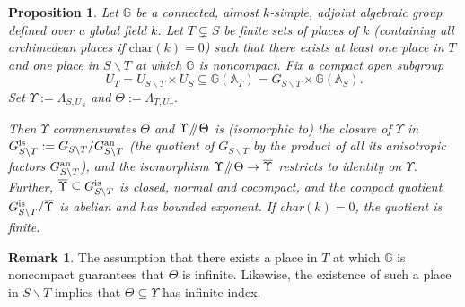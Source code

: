 \documentclass[JEP,XML,SOM,Unicode,published]{cedram}
\newcommand{\Y}{\ensuremath{\Upsilon}}
\let\bs\backslash
\newcommand{\sslash}{\mathbin{\mkern-3mu /\mkern-5mu/ \mkern-3mu}}
\newcommand{\bbA}{\ensuremath{\mathbb{A}}}
\newcommand{\bbG}{\ensuremath{\mathbb{G}}}
\newtheorem{prop}[thm]{Proposition}
\theoremstyle{definition}
\newtheorem{rem}[thm]{Remark}
\begin{document}
\begin{prop}\label{prop:schlichting-arithmetic}
Let $\bbG$ be a connected, almost $k$-simple, adjoint algebraic group defined over a global field $k$. Let $T\subsetneq S$ be finite sets of places of $k$ (containing all archimedean places if $\mathrm{char}(k)=0$) such that there exists at least one place in $T$ and one place in $S\bs T$ at which $\bbG$ is noncompact. Fix a compact open subgroup
\[
U_T=U_{S\bs T} \times U_S\subseteq \bbG(\bbA_T)=G_{S\bs T}\times \bbG(\bbA_S).
\]
Set $\Y:=\Lambda_{S,U_S}$ and $\Theta:=\Lambda_{T,U_T}$.

Then $\Y$ commensurates $\Theta$ and $\Y\sslash\Theta$ is (isomorphic to) the closure of $\Y$ in $G_{S\bs T}^{\textup{is}}:=G_{S\bs T}/G_{S\bs T}^{\textup{an}}$ (the quotient of $G_{S\bs T}$ by the product of all its anisotropic factors $G_{S\bs T}^{\textup{an}}$), and the isomorphism $\Y\sslash\Theta\to\overline{\Y}$ restricts to identity on $\Y$. Further, $\overline{\Y}\subseteq G_{S\bs T}^{\textup{is}}$ is closed, normal and cocompact, and the compact quotient $G_{S\bs T}^{\textup{is}}/\overline{\Y}$ is abelian and has bounded exponent. If char$(k)=0$, the quotient is finite.
\end{prop}
\begin{rem}\label{rem:infty}
The assumption that there exists a place in $T$ at which $\bbG$ is noncompact guarantees that $\Theta$ is infinite. Likewise, the existence of such a place in $S\bs T$ implies that $\Theta\subseteq \Y$ has infinite index.\end{rem}
\end{document}
